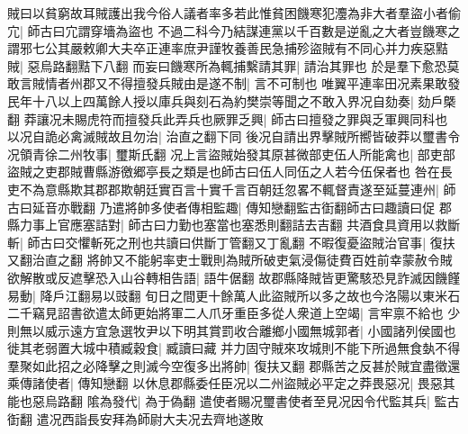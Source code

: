 賊曰以貧窮故耳賊護出我今俗人議者率多若此惟貧困饑寒犯灋為非大者羣盜小者偷宂|{
	師古曰宂謂穿墻為盜也}
不過二科今乃結謀連黨以千百數是逆亂之大者豈饑寒之謂邪七公其嚴敕卿大夫卒正連率庶尹謹牧養善民急捕殄盜賊有不同心并力疾惡黠賊|{
	惡烏路翻黠下八翻}
而妄曰饑寒所為輒捕繫請其罪|{
	請治其罪也}
於是羣下愈恐莫敢言賊情者州郡又不得擅發兵賊由是遂不制|{
	言不可制也}
唯翼平連率田况素果敢發民年十八以上四萬餘人授以庫兵與刻石為約樊崇等聞之不敢入界况自劾奏|{
	劾戶槩翻}
莽讓况未賜虎符而擅發兵此弄兵也厥罪乏興|{
	師古曰擅發之罪與乏軍興同科也}
以况自詭必禽滅賊故且勿治|{
	治直之翻下同}
後况自請出界擊賊所嚮皆破莽以璽書令况領青徐二州牧事|{
	璽斯氏翻}
况上言盜賊始發其原甚微部吏伍人所能禽也|{
	部吏部盜賊之吏郡賊曹縣游徼郷亭長之類是也師古曰伍人同伍之人若今伍保者也}
咎在長吏不為意縣欺其郡郡欺朝廷實百言十實千言百朝廷忽畧不輒督責遂至延蔓連州|{
	師古曰延音亦戰翻}
乃遣將帥多使者傳相監趣|{
	傳知戀翻監古衘翻師古曰趣讀曰促}
郡縣力事上官應塞詰對|{
	師古曰力勤也塞當也塞悉則翻詰去吉翻}
共酒食具資用以救斷斬|{
	師古曰交懼斬死之刑也共讀曰供斷丁管翻又丁亂翻}
不暇復憂盜賊治官事|{
	復扶又翻治直之翻}
將帥又不能躬率吏士戰則為賊所破吏氣浸傷徒費百姓前幸蒙赦令賊欲解散或反遮擊恐入山谷轉相告語|{
	語牛倨翻}
故郡縣降賊皆更驚駭恐見詐滅因饑饉易動|{
	降戶江翻易以豉翻}
旬日之間更十餘萬人此盜賊所以多之故也今洛陽以東米石二千竊見詔書欲遣太師更始將軍二人爪牙重臣多從人衆道上空竭|{
	言牢禀不給也}
少則無以威示遠方宜急選牧尹以下明其賞罰收合離鄉小國無城郭者|{
	小國諸列侯國也}
徙其老弱置大城中積臧穀食|{
	臧讀曰藏}
并力固守賊來攻城則不能下所過無食埶不得羣聚如此招之必降擊之則滅今空復多出將帥|{
	復扶又翻}
郡縣苦之反甚於賊宜盡徵還乘傳諸使者|{
	傳知戀翻}
以休息郡縣委任臣况以二州盜賊必平定之莽畏惡况|{
	畏惡其能也惡烏路翻}
隂為發代|{
	為于偽翻}
遣使者賜况璽書使者至見况因令代監其兵|{
	監古衘翻}
遣况西詣長安拜為師尉大夫况去齊地遂敗

